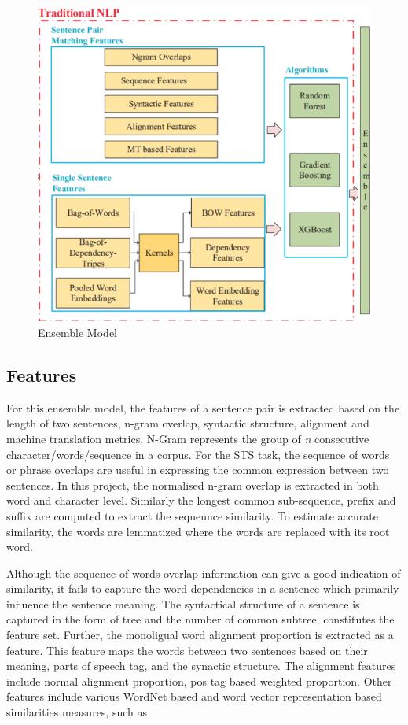 \documentclass[12pt]{report} %
\begin{document}
	\begin{figure}[!tbp]
		\centering
		\includegraphics[scale=0.40]{image/Ensemble.png}
		\caption{Ensemble Model \citep{tian2017ecnu}}
		\label{ensemble}
	\end{figure}
	
	\subsection{Features}
	For this ensemble model, the features of a sentence pair is extracted based on the length of two sentences, n-gram overlap, syntactic structure, alignment and machine translation metrics. N-Gram represents the group of \textit{n} consecutive character/words/sequence in a corpus. For the STS task, the  sequence of words or phrase overlaps are useful in expressing the common expression between two sentences. In this project, the normalised n-gram overlap is extracted in both word and character level. Similarly the longest common sub-sequence, prefix and suffix are computed to extract the sequeunce similarity. To estimate accurate similarity, the words are lemmatized where the words are replaced with its root word. 
	
	Although the sequence of words overlap information can give a good indication of similarity, it fails to capture the word dependencies in a sentence which primarily influence the sentence meaning. The syntactical structure of a sentence is captured in the form of tree and the number of common subtree, constitutes the feature set. Further, the monoligual word alignment proportion is extracted as a feature. This feature maps the words between two sentences based on their meaning, parts of speech tag, and the synactic structure. The alignment features include normal alignment proportion, pos tag based weighted proportion. Other features include various WordNet based and word vector representation based similarities measures, such as
	
\end{document}
